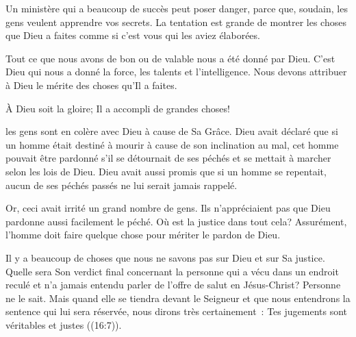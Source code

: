 Un ministère qui a beaucoup de succès peut poser danger, parce que,
 soudain, les gens veulent apprendre vos secrets.
 La tentation est grande de montrer les choses que Dieu a faites
 comme si c'est vous qui les aviez élaborées.

Tout ce que nous avons de bon ou de valable nous a été donné par Dieu.
 C'est Dieu qui nous a donné la force, les talents et l'intelligence.
 Nous devons attribuer à Dieu le mérite des choses qu'Il a faites.

À Dieu soit la gloire; Il a accompli de grandes choses!


\dvrule






 les gens sont en colère avec Dieu à cause de Sa Grâce.
 Dieu avait déclaré que si un homme était destiné à mourir
 à cause de son inclination au mal, cet homme pouvait être pardonné
 s'il se détournait de ses péchés et se mettait à marcher
 selon les lois de Dieu. Dieu avait aussi promis que si un homme se repentait,
 aucun de ses péchés passés ne lui serait jamais rappelé. 

Or, ceci avait irrité un grand nombre de gens. Ils n'appréciaient pas que Dieu
 pardonne aussi facilement le péché. Où est la justice dans tout cela?
 Assurément, l'homme doit faire quelque chose pour mériter le pardon de Dieu. 

Il y a beaucoup de choses que nous ne savons pas sur Dieu et sur Sa justice.
 Quelle sera Son verdict final concernant la personne qui a vécu
 dans un endroit reculé et n'a jamais entendu parler de l'offre de salut
 en Jésus-Christ? Personne ne le sait. Mais quand elle se tiendra
 devant le Seigneur et que nous entendrons la sentence qui lui sera réservée,
 nous dirons très certainement~: 
 \og Tes jugements sont véritables et justes \fg{} ((16:7)). 



